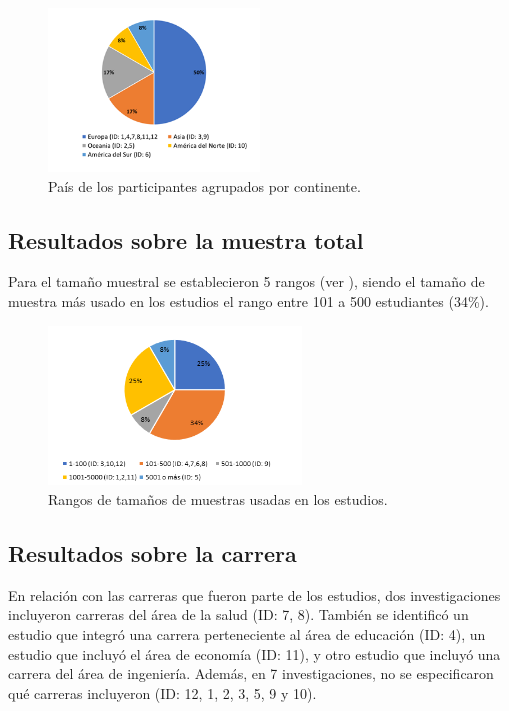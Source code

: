 \documentclass[spanish]{textolivre}
\begin{document}
\begin{figure}[htbp]
 \centering
 \includegraphics[width=0.5\textwidth]{36310-fig2.png}
 \caption{País de los participantes agrupados por continente.}
 \label{fig2}
\end{figure}

\subsection*{Resultados sobre la muestra total}
Para el tamaño muestral se establecieron 5 rangos (ver ), siendo el tamaño de muestra más usado en los estudios el rango entre 101 a 500 estudiantes (34\%).

\begin{figure}[htbp]
 \centering
 \includegraphics[width=0.6\textwidth]{36310-fig3.png}
 \caption{Rangos de tamaños de muestras usadas en los estudios.}
 \label{fig3}
\end{figure}

\subsection*{Resultados sobre la carrera}
En relación con las carreras que fueron parte de los estudios, dos investigaciones incluyeron carreras del área de la salud (ID: 7, 8). También se identificó un estudio que integró una carrera perteneciente al área de educación (ID: 4), un estudio que incluyó el área de economía (ID: 11), y otro estudio que incluyó una carrera del área de ingeniería. Además, en 7 investigaciones, no se especificaron qué carreras incluyeron (ID: 12, 1, 2, 3, 5, 9 y 10).
\end{document}
